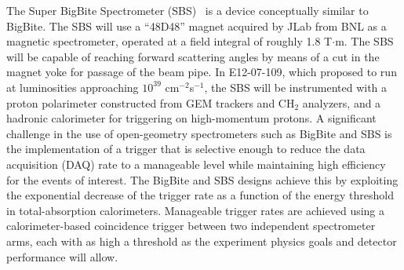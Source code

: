 The Super BigBite Spectrometer (SBS)~\cite{SBS_CDR,SBS_CDR_NEW} is a device conceptually similar to BigBite. The SBS will use a ``48D48'' magnet acquired by JLab from BNL as a magnetic spectrometer, operated at a field integral of roughly 1.8 T$\cdot$m. The SBS will be capable of reaching forward scattering angles by means of a cut in the magnet yoke for passage of the beam pipe. In E12-07-109, which proposed to run at luminosities approaching $10^{39}$ cm$^{-2}$s$^{-1}$, the SBS will be instrumented with a proton polarimeter constructed from GEM trackers and CH$_2$ analyzers, and a hadronic calorimeter for triggering on high-momentum protons. %
A significant challenge in the use of open-geometry spectrometers such as BigBite and SBS is the implementation of a trigger that is selective enough to reduce the data acquisition (DAQ) rate to a manageable level while maintaining high efficiency for the events of interest. The BigBite and SBS designs achieve this by exploiting the exponential decrease of the trigger rate as a function of the energy threshold in total-absorption calorimeters. Manageable trigger rates are achieved using a calorimeter-based coincidence trigger between two independent spectrometer arms, each with as high a threshold as the experiment physics goals and detector performance will allow. %

